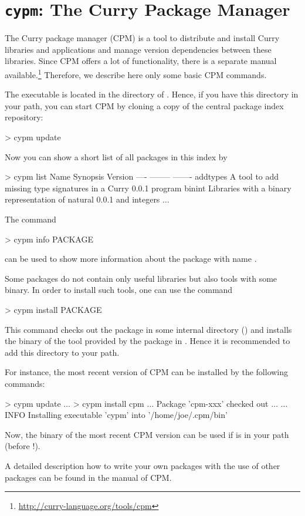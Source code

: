 \section{\texttt{cypm}: The Curry Package Manager}
\label{sec-cpm}

The Curry package manager (CPM) is a tool to
distribute and install Curry libraries and applications
and manage version dependencies between these libraries.
Since CPM offers a lot of functionality, there is a separate
manual available.\footnote{\url{http://curry-language.org/tools/cpm}}
Therefore, we describe here only some basic CPM commands.

The executable  is located in the  directory
of \CYS. Hence, if you have this directory in your path,
you can start CPM by cloning a copy of the central package index repository:
%
\begin{curry}
> cypm update
\end{curry}
%
Now you can show a short list of all packages in this index by
%
\begin{curry}
> cypm list
Name             Synopsis                                             Version   
----             --------                                             -------   
addtypes         A tool to add missing type signatures in a Curry     0.0.1     
                 program                                                        
binint           Libraries with a binary representation of natural    0.0.1     
                 and integers                                                   
$\ldots$
\end{curry}
%
The command
%
\begin{curry}
> cypm info PACKAGE
\end{curry}
%
can be used to show more information about the package with name
.

Some packages do not contain only useful libraries
but also tools with some binary. In order to install such tools,
one can use the command
%
\begin{curry}
> cypm install PACKAGE
\end{curry}
%
This command checks out the package in some internal directory
()
and installs the binary of the tool provided by the package
in .
Hence it is recommended to add this directory to your path.

For instance, the most recent version of CPM
can be installed by the following commands:
%
\begin{curry}
> cypm update
$\ldots$
> cypm install cpm
$\ldots$ Package 'cpm-xxx' checked out $\ldots$
$\ldots$
INFO  Installing executable 'cypm' into '/home/joe/.cpm/bin'
\end{curry}
%
Now, the binary  of the most recent CPM version can be used
if  is in your path
(before !).

A detailed description how to write your own packages
with the use of other packages can be found in the manual of CPM.

